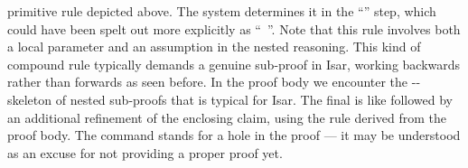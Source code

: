 \begin{isabellebody}
\begin{isamarkuptext}
  primitive rule depicted above.  The system determines it in the
  ``\hyperlink{command.proof}{\mbox{}}'' step, which could have been spelt out more
  explicitly as ``\hyperlink{command.proof}{\mbox{}}~''.  Note
  that this rule involves both a local parameter  and an
  assumption  in the nested reasoning.  This kind of
  compound rule typically demands a genuine sub-proof in Isar, working
  backwards rather than forwards as seen before.  In the proof body we
  encounter the \hyperlink{command.fix}{\mbox{}}-\hyperlink{command.assume}{\mbox{}}-\hyperlink{command.show}{\mbox{}}
  skeleton of nested sub-proofs that is typical for Isar.  The final
  \hyperlink{command.show}{\mbox{}} is like \hyperlink{command.have}{\mbox{}} followed by an
  additional refinement of the enclosing claim, using the rule derived
  from the proof body.  The \hyperlink{command.sorry}{\mbox{}} command stands for a
  hole in the proof --- it may be understood as an excuse for not
  providing a proper proof yet.


\end{isamarkuptext}
\end{isabellebody}
